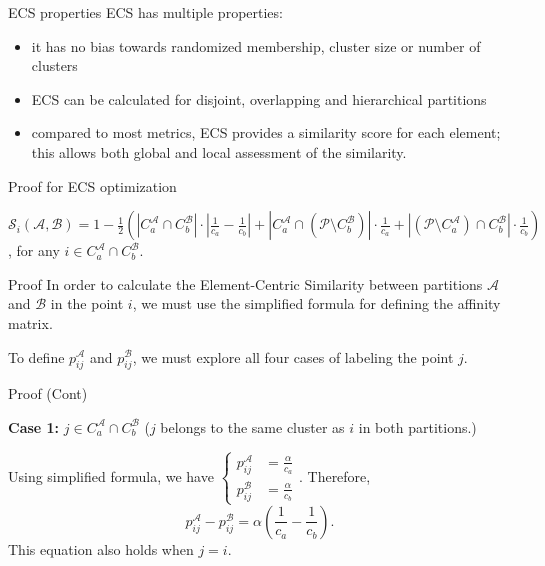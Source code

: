 
\begin{frame}[label=app1]{ECS properties}
ECS has multiple properties:
\begin{itemize}
    \item it has no bias towards randomized membership, cluster size or number of clusters
    \item ECS can be calculated for disjoint, overlapping and hierarchical partitions
    \item compared to most metrics, ECS provides a similarity score for each element; this allows both global and local assessment of the similarity.
\end{itemize}
    \hyperlink{ecs-first}{}
\end{frame}

\begin{frame}[label=proof]{Proof for ECS optimization}
    
\begin{remark} \label{remark:ecs-constant}
    $\displaystyle\mathcal{S}_i(\mathcal{A}, \mathcal{B}) = 1-\frac{1}{2}\left(|C_a^\mathcal{A} \cap C_b^\mathcal{B}|\cdot \left|\frac{1}{c_a} - \frac{1}{c_b}\right| + |C_a^\mathcal{A} \cap (\mathcal{P} \setminus C_b^{\mathcal{B}})| \cdot \frac{1}{c_a} + |(\mathcal{P} \setminus C_a^\mathcal{A}) \cap C_b^\mathcal{B}|\cdot \frac{1}{c_b} \right)$, for any $i \in C_a^\mathcal{A} \cap C_b^\mathcal{B}$.
\end{remark}

\begin{block}{Proof}
   In order to calculate the Element-Centric Similarity between partitions $\mathcal{A}$ and $\mathcal{B}$ in the point $i$, we must use the simplified formula for defining the affinity matrix.

   To define $p_{ij}^{\mathcal{A}}$ and $p_{ij}^{\mathcal{B}}$, we must explore all four cases of labeling the point $j$. 
\end{block}
    \hyperlink{optslide}{}
\end{frame}

\begin{frame}
\begin{block}{Proof (Cont)}
    
   \textbf{Case 1:} $j \in C_a^{\mathcal{A}} \cap C_b^{\mathcal{B}}$ ($j$ belongs to the same cluster as $i$ in both partitions.)

   Using simplified formula, we have $\displaystyle
    \begin{cases}
        p_{ij}^\mathcal{A} &= \frac{\alpha}{c_a} \\
        p_{ij}^\mathcal{B} &= \frac{\alpha}{c_b} 
    \end{cases}$. Therefore, 
    \[ p_{ij}^\mathcal{A} - p_{ij}^\mathcal{B} = \alpha \left(\frac{1}{c_a} - \frac{1}{c_b}\right) .\]
%
    This equation also holds when $j = i$.
    \end{block}
    \hyperlink{optslide}{}
    \end{frame}

